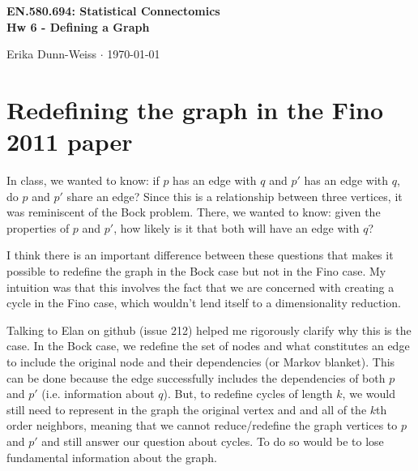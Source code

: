 \documentclass[12pt]{article}
\begin{document}
\begin{center}\Large \bf EN.580.694: Statistical Connectomics \\ Hw 6 - Defining a Graph \end{center}
\begin{center} Erika Dunn-Weiss $\cdot$  \today \end{center}
\bigskip

\section*{Redefining the graph in the Fino 2011 paper} 

In class, we wanted to know: if $p$ has an edge with $q$ and $p'$ has an edge with $q$, do $p$ and $p'$ share an edge? Since this is a relationship between three vertices, it was reminiscent of the Bock problem. There, we wanted to know: given the properties of $p$ and $p'$, how likely is it that both will have an edge with $q$? 

I think there is an important difference between these questions that makes it possible to redefine the graph in the Bock case but not in the Fino case. My intuition was that this involves the fact that we are concerned with creating a cycle in the Fino case, which wouldn't lend itself to a dimensionality reduction. 

Talking to Elan on github (issue 212) helped me rigorously clarify why this is the case. In the Bock case, we redefine the set of nodes and what constitutes an edge to include the original node and their dependencies (or Markov blanket). This can be done because the edge successfully includes the dependencies of both $p$ and $p'$ (i.e. information about $q$). But, to redefine cycles of length $k$, we would still need to represent in the graph the original vertex and and all of the $k$th order neighbors, meaning that we cannot reduce/redefine the graph vertices to $p$ and $p'$ and still answer our question about cycles. To do so would be to lose fundamental information about the graph.
\end{document}
